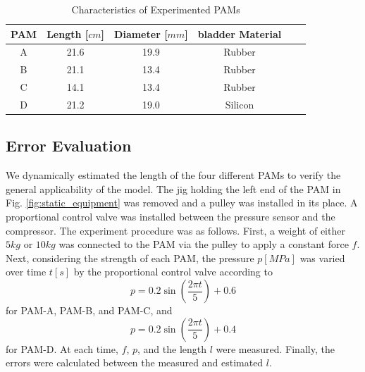 \begin{table}[h]
    \centering
    \caption{Characteristics of Experimented PAMs}
    \begin{tabular}{c|ccccc}
        \hline
        PAM & Length [$\si{cm}$] & Diameter [$\si{mm}$] & bladder Material\\
        \hline \hline
        A & 21.6 & 19.9 &  Rubber \\
        B &21.1  & 13.4 &  Rubber \\
        C & 14.1 & 13.4 &  Rubber \\
        D & 21.2 & 19.0 & Silicon \\
        \hline
    \end{tabular}
\label{tab:PAM}
\end{table}


\subsection{Error Evaluation}
We dynamically estimated the length of the four different PAMs to verify the general applicability of the model.
The jig holding the left end of the PAM in Fig. \ref{fig:static_equipment} was removed and a pulley was installed in its place. A proportional control valve was installed between the pressure sensor and the compressor.
The experiment procedure was as follows. First, a weight of either $5\si{kg}$ or $10\si{kg}$ was connected to the PAM via the pulley to apply a constant force $f$. Next, considering the strength of each PAM, the pressure $p [\si{MPa}]$ was varied over time $t [\si{s}]$ by the proportional control valve according to 
\begin{equation}
p = 0.2 \sin\left(\frac{2 \pi t}{5}\right) + 0.6
\label{eq:Pref}
\end{equation}
for PAM-A, PAM-B, and PAM-C, and
\begin{equation}
p = 0.2 \sin\left(\frac{2 \pi t}{5}\right) + 0.4
\label{eq:Prefd}
\end{equation}
for PAM-D. At each time, $f$, $p$, and the length $l$ were measured. 
Finally, the errors were calculated between the measured and estimated $l$.

